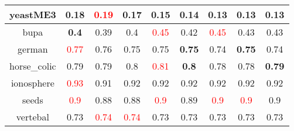 \documentclass{article}%
\begin{document}
\begin{tabular}{c|cccccccc}
yeastME3&0.18&\textcolor{red}{ 
0.19
}&\textbf{0.17}&0.15&\textbf{0.14}&0.13&0.13&0.13\\%
\hline%
bupa&\textbf{0.4}&0.39&0.4&\textcolor{red}{ 
0.45
}&0.42&\textcolor{red}{ 
0.45
}&0.43&0.43\\%
\hline%
german&\textcolor{red}{ 
0.77
}&0.76&0.75&0.75&\textbf{0.75}&0.74&\textbf{0.75}&0.74\\%
\hline%
horse\_colic&0.79&0.79&0.8&\textcolor{red}{ 
0.81
}&\textbf{0.8}&0.78&0.78&\textbf{0.79}\\%
\hline%
ionosphere&\textcolor{red}{ 
0.93
}&0.91&0.92&0.92&0.92&0.92&0.92&0.92\\%
\hline%
seeds&\textcolor{red}{ 
0.9
}&0.88&0.88&\textcolor{red}{ 
0.9
}&0.89&\textcolor{red}{ 
0.9
}&\textcolor{red}{ 
0.9
}&0.9\\%
\hline%
vertebal&0.73&\textcolor{red}{ 
0.74
}&\textcolor{red}{ 
0.74
}&0.73&0.73&0.73&0.73&0.73\\%
\hline%
\end{tabular}

%
\end{document}
